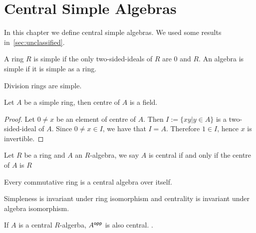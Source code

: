 \chapter{Central Simple Algebras}\label{sec:csa}

In this chapter we define central simple algebras. We used some results
in~\cref{sec:unclassified}.

\begin{definition} A ring $R$ is simple if the only
  two-sided-ideals of $R$ are ${0}$ and $R$. An algebra is simple if it is
  simple as a ring.
  \leanok
\end{definition}

\begin{remark}
  Division rings are simple.
\end{remark}

\begin{lemma}
  \label{lem:center-simple-ring}
  Let $A$ be a simple ring, then centre of $A$ is a field. \leanok
\end{lemma}
\begin{proof}
  Let $0\ne x$ be an element of centre of $A$. Then $I := \{xy | y\in A\}$ is a
  two-sided-ideal of $A$. Since $0\ne x\in I$, we have that $I = A$. Therefore
  $1 \in I$, hence $x$ is invertible.
\end{proof}

\begin{definition}
  Let $R$ be a ring and $A$ an $R$-algebra, we say $A$ is central if and only if
  the centre of $A$ is $R$
  \leanok
\end{definition}

\begin{remark}
  Every commutative ring is a central algebra over itself.
\end{remark}

\begin{remark}
  Simpleness is invariant under ring isomorphism and centrality is invariant
  under algebra isomorphism.
\end{remark}

\begin{lemma}
  \label{lem:opp-central}
  If $A$ is a central $R$-algerba, $A^{\mathsf{opp}}$ is also central.
  \leanok
  .
\end{lemma}

